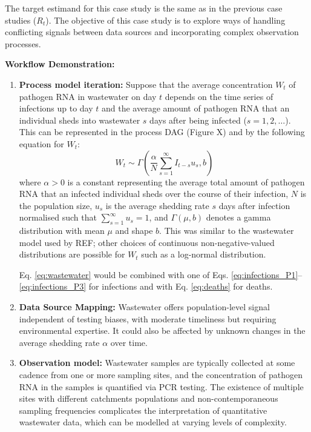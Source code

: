 \documentclass{article}
\begin{document}
The target estimand for this case study is the same as in the previous case studies ($R_t$). The objective of this case study is to explore ways of handling conflicting signals between data sources and incorporating complex observation processes.

\textbf{Workflow Demonstration:}
\begin{enumerate}
    \item \textbf{Process model iteration:} 
    Suppose that the average concentration $W_t$ of pathogen RNA in wastewater on day $t$ depends on the time series of infections up to day $t$ and the average amount of pathogen RNA that an individual sheds into wastewater $s$ days after being infected ($s=1,2,\ldots$). This can be represented in the process DAG (Figure X) and by the following equation for $W_t$:
    \begin{equation} \label{eq:wastewater}
        W_t \sim \Gamma\left( \frac{\alpha}{N}\sum_{s=1}^\infty I_{t-s}u_s, b   \right)
    \end{equation}
    where $\alpha>0$ is a constant representing the average total amount of pathogen RNA that an infected individual sheds over the course of their infection, $N$ is the population size, $u_s$ is the average shedding rate $s$ days after infection normalised such that $\sum_{s=1}^\infty u_s=1$, and $\Gamma(\mu,b)$ denotes a gamma distribution with mean $\mu$ and shape $b$. This was similar to the wastewater model used by REF; other choices of continuous non-negative-valued distributions are possible for $W_t$ such as a log-normal distribution.

    Eq. \eqref{eq:wastewater} would be combined with one of Eqs. \eqref{eq:infections_P1}--\eqref{eq:infections_P3} for infections and with Eq. \eqref{eq:deaths} for deaths.
    \item \textbf{Data Source Mapping:} Wastewater offers population-level signal independent of testing biases, with moderate timeliness but requiring environmental expertise. It could also be affected by unknown changes in the average shedding rate $\alpha$ over time. 
    \item \textbf{Observation model:} 
   Wastewater samples are typically collected at some cadence from one or more sampling sites, and the concentration of pathogen RNA in the samples is quantified via PCR testing. 
   The existence of multiple sites with different catchments populations and non-contemporaneous sampling frequencies complicates the interpretation of quantitative wastewater data, which can be modelled at varying levels of complexity.  
   

\end{enumerate}
\end{document}
